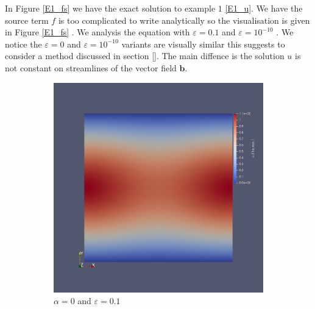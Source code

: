 \documentclass[12pt,a4paper]{article}
\begin{document}
In Figure \ref{E1_fs} we have the exact solution to example $1$ \ref{E1_u}. We have the source term $f$ is too complicated to write analytically so the visualisation is given in Figure \ref{E1_fs} . We analysis the equation with $\varepsilon = 0.1$ and $\varepsilon = 10^{-10}$ . We notice the $\varepsilon = 0$ and $\varepsilon = 10^{-10}$ variants are visually similar this suggests to consider a method discussed in section \ref{}. The main diffence is the solution $u$ is not constant on streamlines of the vector field $\mathbf{b}$.
\begin{figure}[H]
 \begin{subfigure}{0.44\textwidth}
     \includegraphics[width=\textwidth]{Pics/uf/U_E1a_eps1.png}
     \caption{$\alpha=0$ and $\varepsilon = 0.1$}
 \end{subfigure}
   \begin{subfigure}{0.44\textwidth}

\end{subfigure}
\end{figure}
\end{document}
